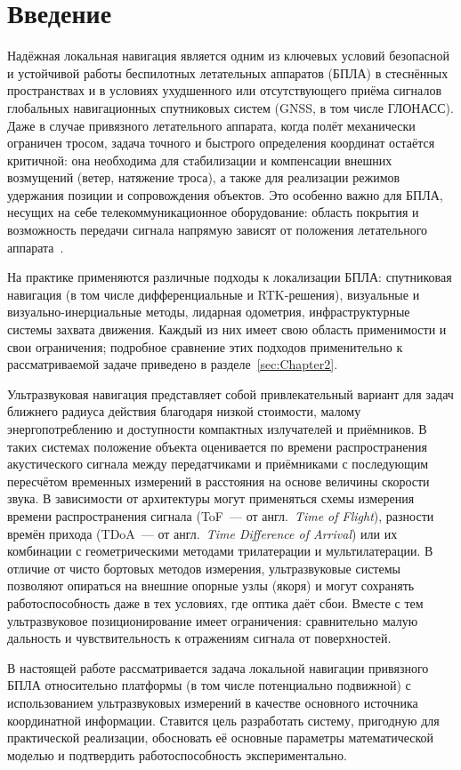 \section{Введение}
\label{sec:Chapter0}

Надёжная локальная навигация является одним из ключевых условий безопасной и
устойчивой работы беспилотных летательных аппаратов (БПЛА) в стеснённых
пространствах и в условиях ухудшенного или отсутствующего приёма сигналов
глобальных навигационных спутниковых систем (GNSS, в том числе ГЛОНАСС). Даже в случае
привязного летательного аппарата, когда полёт механически ограничен тросом,
задача точного и быстрого определения координат остаётся критичной: она
необходима для стабилизации и компенсации внешних возмущений (ветер, натяжение
троса), а также для реализации режимов удержания позиции и сопровождения
объектов. Это особенно важно для БПЛА, несущих на себе телекоммуникационное
оборудование: область покрытия и возможность передачи сигнала напрямую зависят
от положения летательного аппарата~\cite{vishnevsky2013}.

На практике применяются различные подходы к локализации БПЛА: спутниковая
навигация (в том числе дифференциальные и RTK-решения), визуальные и
визуально-инерциальные методы, лидарная одометрия, инфраструктурные системы
захвата движения. Каждый из них имеет свою область применимости и свои
ограничения; подробное сравнение этих подходов применительно к рассматриваемой
задаче приведено в разделе~\ref{sec:Chapter2}.

Ультразвуковая навигация представляет собой привлекательный вариант для задач
ближнего радиуса действия благодаря низкой стоимости, малому энергопотреблению и
доступности компактных излучателей и приёмников. В таких системах положение
объекта оценивается по времени распространения акустического сигнала между
передатчиками и приёмниками с последующим пересчётом временных измерений в
расстояния на основе величины скорости звука. В зависимости от архитектуры могут
применяться схемы измерения времени распространения сигнала (ToF~--- от англ.\ \textit{Time of
Flight}), разности времён прихода (TDoA~--- от англ.\ \textit{Time Difference of
Arrival}) или их комбинации с геометрическими методами трилатерации и
мультилатерации. В отличие от чисто бортовых методов измерения, ультразвуковые
системы позволяют опираться на внешние опорные узлы (якоря) и могут сохранять работоспособность
даже в тех условиях, где оптика даёт сбои. Вместе с тем ультразвуковое
позиционирование имеет ограничения: сравнительно малую дальность и
чувствительность к отражениям сигнала от поверхностей.

В настоящей работе рассматривается задача локальной навигации привязного БПЛА
относительно платформы (в том числе потенциально подвижной) с использованием
ультразвуковых измерений в качестве основного источника координатной информации.
Ставится цель разработать систему, пригодную для практической реализации,
обосновать её основные параметры математической моделью и подтвердить
работоспособность экспериментально.
